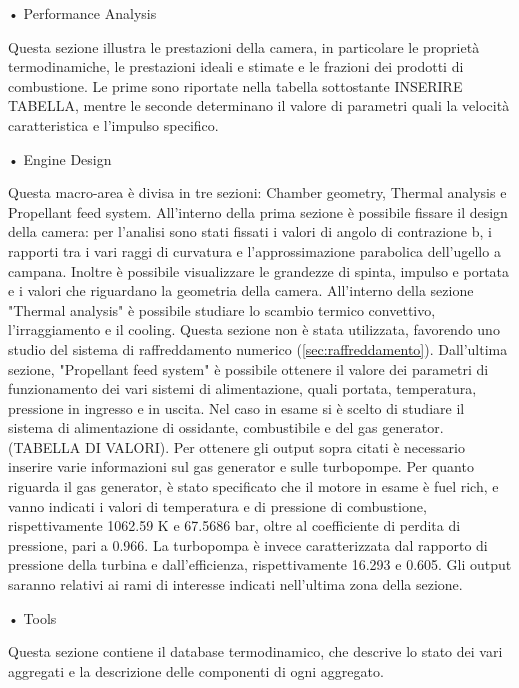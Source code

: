 • Performance Analysis

Questa sezione illustra le prestazioni della camera, in particolare le proprietà termodinamiche, le prestazioni ideali e stimate e le frazioni dei prodotti di combustione. Le prime sono riportate nella tabella sottostante INSERIRE TABELLA, mentre le seconde determinano il valore di parametri quali la velocità caratteristica e l'impulso specifico. 

• Engine Design

Questa macro-area è divisa in tre sezioni: Chamber geometry, Thermal analysis e Propellant feed system.
All'interno della prima sezione è possibile fissare il design della camera: per l'analisi sono stati fissati i valori di angolo di contrazione b, i rapporti tra i vari raggi di curvatura e l'approssimazione parabolica dell'ugello a campana. Inoltre è possibile visualizzare le grandezze di spinta, impulso e portata e i valori che riguardano la geometria della camera.
All'interno della sezione "Thermal analysis" è possibile studiare lo scambio termico convettivo, l'irraggiamento e il cooling. Questa sezione non è stata utilizzata, favorendo uno studio del sistema di raffreddamento numerico (\autoref{sec:raffreddamento}).
Dall'ultima sezione, "Propellant feed system" è possibile ottenere il valore dei parametri di funzionamento dei vari sistemi di alimentazione, quali portata, temperatura, pressione in ingresso e in uscita. Nel caso in esame si è scelto di studiare il sistema di alimentazione di ossidante, combustibile e del gas generator. (TABELLA DI VALORI). Per ottenere gli output sopra citati è necessario inserire varie informazioni sul gas generator e sulle turbopompe. Per quanto riguarda il gas generator, è stato specificato che il motore in esame è fuel rich, e vanno indicati i valori di temperatura e di pressione di combustione, rispettivamente 1062.59 K e 67.5686 bar, oltre al coefficiente di perdita di pressione, pari a 0.966. La turbopompa è invece caratterizzata dal rapporto di pressione della turbina e dall'efficienza, rispettivamente 16.293 e 0.605. 
Gli output saranno relativi ai rami di interesse indicati nell'ultima zona della sezione.

• Tools 

Questa sezione contiene il database termodinamico, che descrive lo stato dei vari aggregati e la descrizione delle componenti di ogni aggregato.

